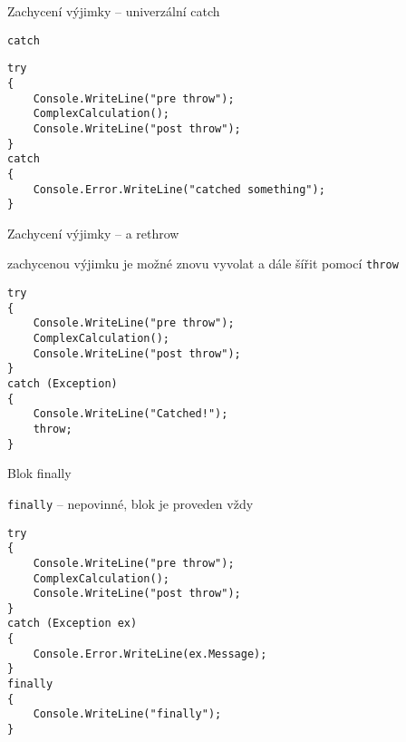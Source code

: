 \begin{frame}[fragile]
\begin{bitemize}{Zachycení výjimky -- univerzální catch}
\item \lstinline|catch|
\end{bitemize}
\vfill
\begin{yesblock}
\begin{lstlisting}
try
{
    Console.WriteLine("pre throw");
    ComplexCalculation();
    Console.WriteLine("post throw");
}
catch 
{
    Console.Error.WriteLine("catched something");
}
\end{lstlisting}
\end{yesblock}
\end{frame}


\begin{frame}[fragile]
\begin{bitemize}{Zachycení výjimky -- a rethrow}
\item zachycenou výjimku je možné znovu vyvolat a dále šířit pomocí \lstinline|throw|
\end{bitemize}
\vfill
\begin{yesblock}
\begin{lstlisting}
try
{
    Console.WriteLine("pre throw");
    ComplexCalculation();
    Console.WriteLine("post throw");
}
catch (Exception)
{
    Console.WriteLine("Catched!");
    throw;
}
\end{lstlisting}
\end{yesblock}
\end{frame}


\begin{frame}[fragile]
\begin{bitemize}{Blok finally}
\item \lstinline|finally| -- nepovinné, blok je proveden vždy
\end{bitemize}
\vfill
\begin{yesblock}
\begin{lstlisting}
try
{
    Console.WriteLine("pre throw");
    ComplexCalculation();
    Console.WriteLine("post throw");
}
catch (Exception ex)
{
    Console.Error.WriteLine(ex.Message);
}
finally
{
    Console.WriteLine("finally");
}
\end{lstlisting}
\end{yesblock}
\end{frame}





